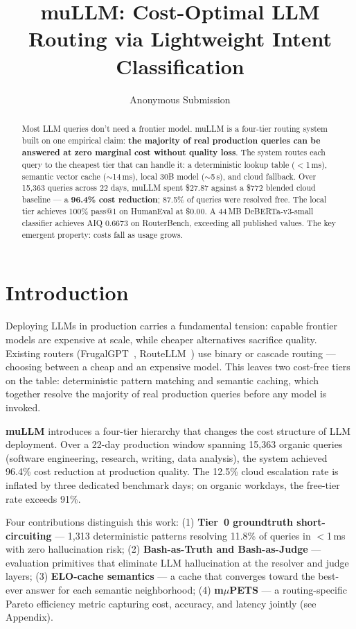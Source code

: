 \documentclass[11pt]{article}
\title{muLLM: Cost-Optimal LLM Routing via Lightweight Intent Classification}
\author{Anonymous Submission}
\begin{document}
\maketitle

\begin{abstract}
Most LLM queries don't need a frontier model. muLLM is a four-tier
routing system built on one empirical claim: \textbf{the majority of
real production queries can be answered at zero marginal cost without
quality loss}. The system routes each query to the cheapest tier that
can handle it: a deterministic lookup table ($<$1\,ms), semantic vector
cache ($\sim$14\,ms), local 30B model ($\sim$5\,s), and cloud fallback.
Over 15,363 queries across 22 days, muLLM spent \$27.87 against a \$772
blended cloud baseline --- a \textbf{96.4\% cost reduction}; 87.5\% of
queries were resolved free. The local tier achieves 100\% pass@1 on
HumanEval at \$0.00. A 44\,MB DeBERTa-v3-small classifier achieves AIQ
0.6673 on RouterBench, exceeding all published values. The key emergent
property: costs fall as usage grows.
\end{abstract}

\section{Introduction}

Deploying LLMs in production carries a fundamental tension: capable
frontier models are expensive at scale, while cheaper alternatives
sacrifice quality. Existing routers
(FrugalGPT~\cite{chen2023frugalgpt}, RouteLLM~\cite{ong2024routellm})
use binary or cascade routing --- choosing between a cheap and an
expensive model. This leaves two cost-free tiers on the table:
deterministic pattern matching and semantic caching, which together
resolve the majority of real production queries before any model is
invoked.

\textbf{muLLM} introduces a four-tier hierarchy that changes the cost
structure of LLM deployment. Over a 22-day production window spanning
15,363 organic queries (software engineering, research, writing, data
analysis), the system achieved 96.4\% cost reduction at production
quality. The 12.5\% cloud escalation rate is inflated by three
dedicated benchmark days; on organic workdays, the free-tier rate
exceeds 91\%.

Four contributions distinguish this work: (1) \textbf{Tier~0 groundtruth
short-circuiting} --- 1,313 deterministic patterns resolving 11.8\% of
queries in $<$1\,ms with zero hallucination risk; (2) \textbf{Bash-as-Truth
and Bash-as-Judge} --- evaluation primitives that eliminate LLM
hallucination at the resolver and judge layers; (3) \textbf{ELO-cache
semantics} --- a cache that converges toward the best-ever answer for
each semantic neighborhood; (4) \textbf{m$\mu$PETS} --- a routing-specific
Pareto efficiency metric capturing cost, accuracy, and latency jointly
(see Appendix).
\end{document}
